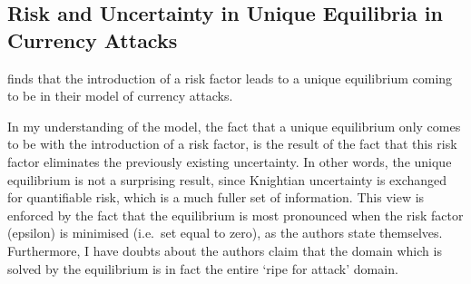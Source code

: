 \documentclass[a4paper]{report}\usepackage{graphicx, color}
\begin{document}
\begin{refsection}

\chapter{Risk and Uncertainty in Unique Equilibria in Currency Attacks}
\label{currency}
\textcite{morris1998unique} finds that the introduction of a risk factor leads to a unique equilibrium coming to be in their model of currency attacks.

In my understanding of the model, the fact that a unique equilibrium only comes to be with the introduction of a risk factor, is the result of the fact that this risk factor eliminates the previously existing uncertainty. In other words, the unique equilibrium is not a surprising result, since Knightian uncertainty is exchanged for quantifiable risk, which is a much fuller set of information. This view is enforced by the fact that the equilibrium is most pronounced when the risk factor (epsilon) is minimised (i.e.~set equal to zero), as the authors state themselves. Furthermore, I have doubts about the authors claim that the domain which is solved by the equilibrium is in fact the entire `ripe for attack' domain.

\nocite{taleb2010black}
\printbibliography
\end{refsection}
\end{document}
